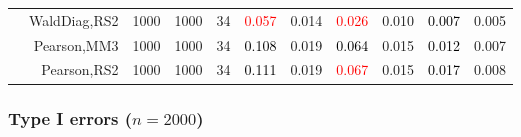 \documentclass[
]{article}
\begin{document}
\begin{table}[H]
{\begin{tabular}[t]{lrrrrrrrlrr}
\hspace{1em} & WaldDiag,RS2 & 1000 & 1000 & 34 & \textcolor{red}{0.057} & 0.014 & \textcolor{red}{0.026} & 0.010 & \textcolor{black}{0.007} & 0.005\\

\hspace{1em} & Pearson,MM3 & 1000 & 1000 & 34 & \textcolor{black}{0.108} & 0.019 & \textcolor{black}{0.064} & 0.015 & \textcolor{black}{0.012} & 0.007\\

\hspace{1em} & Pearson,RS2 & 1000 & 1000 & 34 & \textcolor{black}{0.111} & 0.019 & \textcolor{red}{0.067} & 0.015 & \textcolor{black}{0.017} & 0.008\\
\bottomrule
\end{tabular}}
\endgroup{}
\end{table}

\hypertarget{type-i-errors-n2000}{%
\subsubsection{\texorpdfstring{Type I errors
(\(n=2000\))}{Type I errors (n=2000)}}\label{type-i-errors-n2000}}
\end{document}
